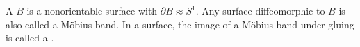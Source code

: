A  $B$ is a nonorientable surface with $\partial B \approx S^1$. Any surface diffeomorphic to $B$ is also called a Möbius band. In a surface, the image of a Möbius band under gluing is called a .
